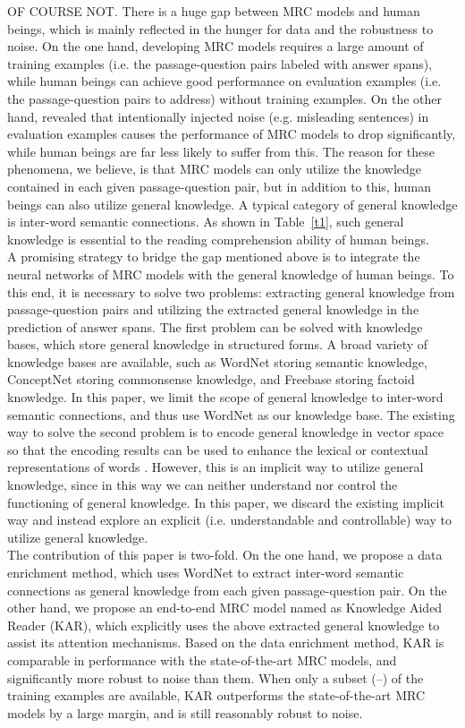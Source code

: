 \documentclass[11pt,a4paper]{article}
\begin{document}
OF COURSE NOT. There is a huge gap between MRC models and human beings, which is mainly reflected in the hunger for data and the robustness to noise. On the one hand, developing MRC models requires a large amount of training examples (i.e. the passage-question pairs labeled with answer spans), while human beings can achieve good performance on evaluation examples (i.e. the passage-question pairs to address) without training examples. On the other hand, \citet{jiarobin:2017} revealed that intentionally injected noise (e.g. misleading sentences) in evaluation examples causes the performance of MRC models to drop significantly, while human beings are far less likely to suffer from this. The reason for these phenomena, we believe, is that MRC models can only utilize the knowledge contained in each given passage-question pair, but in addition to this, human beings can also utilize general knowledge. A typical category of general knowledge is inter-word semantic connections. As shown in Table~\ref{t1}, such general knowledge is essential to the reading comprehension ability of human beings. \\
A promising strategy to bridge the gap mentioned above is to integrate the neural networks of MRC models with the general knowledge of human beings. To this end, it is necessary to solve two problems: extracting general knowledge from passage-question pairs and utilizing the extracted general knowledge in the prediction of answer spans. The first problem can be solved with knowledge bases, which store general knowledge in structured forms. A broad variety of knowledge bases are available, such as WordNet \cite{fellbaumchristiane:1998} storing semantic knowledge, ConceptNet \cite{speerrobert:2017} storing commonsense knowledge, and Freebase \cite{bollackerkurt:2008} storing factoid knowledge. In this paper, we limit the scope of general knowledge to inter-word semantic connections, and thus use WordNet as our knowledge base. The existing way to solve the second problem is to encode general knowledge in vector space so that the encoding results can be used to enhance the lexical or contextual representations of words \cite{weissenborndirk:2017, mihaylovtodor:2018}. However, this is an implicit way to utilize general knowledge, since in this way we can neither understand nor control the functioning of general knowledge. In this paper, we discard the existing implicit way and instead explore an explicit (i.e. understandable and controllable) way to utilize general knowledge. \\
The contribution of this paper is two-fold. On the one hand, we propose a data enrichment method, which uses WordNet to extract inter-word semantic connections as general knowledge from each given passage-question pair. On the other hand, we propose an end-to-end MRC model named as Knowledge Aided Reader (KAR), which explicitly uses the above extracted general knowledge to assist its attention mechanisms. Based on the data enrichment method, KAR is comparable in performance with the state-of-the-art MRC models, and significantly more robust to noise than them. When only a subset (--) of the training examples are available, KAR outperforms the state-of-the-art MRC models by a large margin, and is still reasonably robust to noise.
\end{document}
